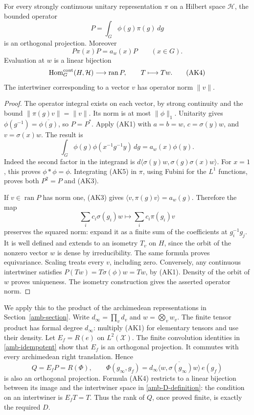 \begin{proposition}\label{ak-projection}
For every strongly continuous unitary representation \(\pi\)
on a Hilbert space \(\mathcal H\), the bounded operator
\[
                  P=\int_G\phi(g)\pi(g)\,dg
\]
is an orthogonal projection.  Moreover
\[
                  P\pi(x)P=a_w(x)P \qquad(x\in G).
 \tag{AK3}
\]
Evaluation at \(w\) is a linear bijection
\[
 \operatorname{Hom}^{\rm cont}_G(H,\mathcal H)
                       \longrightarrow\operatorname{ran}P,
                  \qquad T\longmapsto Tw .
 \tag{AK4}
\]
The intertwiner corresponding to a vector \(v\) has operator
norm \(\|v\|\).
\end{proposition}
\begin{proof}
The operator integral exists on each vector, by strong
continuity and the bound \(\|\pi(g)v\|=\|v\|\).
Its norm is at most \(\|\phi\|_1\).
Unitarity gives
\(\phi(g^{-1})=\overline{\phi(g)}\), so \(P=P^*\).
Apply (AK1) with \(a=b=w\), \(c=\sigma(y)w\), and
\(v=\sigma(x)w\).  The result is
\[
 \int_G\phi(g)\phi(x^{-1}g^{-1}y)\,dg
                                      =a_w(x)\phi(y).
 \tag{AK5}
\]
Indeed the second factor in the integrand is
\(d\langle\sigma(y)w,\sigma(g)\sigma(x)w\rangle\).
For \(x=1\), this proves \(\phi*\phi=\phi\).
Integrating (AK5) in \(\pi\), using Fubini for the
\(L^1\) functions, proves both \(P^2=P\) and (AK3).

If \(v\in\operatorname{ran}P\) has norm one, (AK3) gives
\(\langle v,\pi(g)v\rangle=a_w(g)\).  Therefore the map
\[
       \sum_i c_i\sigma(g_i)w\longmapsto
                          \sum_i c_i\pi(g_i)v
\]
preserves the squared norm: expand it as a finite sum
of the coefficients at \(g_i^{-1}g_j\).
It is well defined and extends to an isometry \(T_v\)
on \(H\), since the orbit of the nonzero vector \(w\)
is dense by irreducibility.  The same formula proves
equivariance.  Scaling treats every \(v\), including zero.
Conversely, any continuous intertwiner satisfies
\(P(Tw)=T\sigma(\phi)w=Tw\), by (AK1).
Density of the orbit of \(w\) proves uniqueness.
The isometry construction gives the asserted operator norm.
\end{proof}

We apply this to the product of the archimedean
representations in Section~\ref{amb-section}.
Write \(d_\infty=\prod_vd_v\) and
\(w=\bigotimes_v w_v\).  The finite tensor product has
formal degree \(d_\infty\): multiply (AK1) for elementary
tensors and use their density.  Let \(E_f=R(e)\) on
\(L^2(\mathcal X)\).  The finite convolution identities
in \eqref{amb-idempotent} show that \(E_f\) is an
orthogonal projection.  It commutes with every
archimedean right translation.  Hence
\[
 Q=E_fP=R(\Phi),\qquad
 \Phi(g_\infty,g_f)=d_\infty
       \overline{\langle w,\sigma(g_\infty)w\rangle}\,e(g_f)
 \tag{AK6}
\]
is also an orthogonal projection.  Formula (AK4) restricts
to a linear bijection between its image and the intertwiner
space in \eqref{amb-D-definition}: the condition on an
intertwiner is \(E_fT=T\).  Thus the rank of \(Q\), once
proved finite, is exactly the required \(D\).

